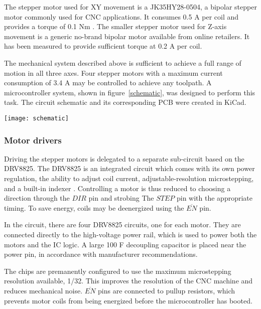 The stepper motor used for XY movement is a JK35HY28-0504, a bipolar stepper
motor commonly used for CNC applications. It consumes 0.5 A per coil and
provides a torque of 0.1 Nm \cite{jk35hy28}. The smaller stepper motor used for
Z-axis movement is a generic no-brand bipolar motor available from online
retailers. It has been measured to provide sufficient torque at 0.2 A per coil.

The mechanical system described above is sufficient to achieve a full range of
motion in all three axes. Four stepper motors with a maximum current consumption
of 3.4 A may be controlled to achieve any toolpath. A microcontroller system,
shown in figure~\ref{schematic}, was designed to perform this task. The
circuit schematic and its corresponding PCB were created in KiCad.

\clearpage
\begin{sidewaysfigure}[ht]
    \texttt{[image: schematic]}
    \caption{A schematic of the microcontroller system.}
    \label{schematic}
\end{sidewaysfigure}

\clearpage

\subsubsection{Motor drivers}

Driving the stepper motors is delegated to a separate sub-circuit based on the
DRV8825. The DRV8825 is an integrated circuit which comes with its own power
regulation, the ability to adjust coil current, adjustable-resolution
microstepping, and a built-in indexer \cite{drv8825}. Controlling a motor is
thus reduced to choosing a direction through the $DIR$ pin and strobing The
$STEP$ pin with the appropriate timing. To save energy, coils may be deenergized
using the $\overline{EN}$ pin.

In the circuit, there are four DRV8825 circuits, one for each motor. They are
connected directly to the high-voltage power rail, which is used to power both
the motors and the IC logic. A large 100 {\textmu}F decoupling capacitor is
placed near the power pin, in accordance with manufacturer recommendations.

The chips are premanently configured to use the maximum microstepping resolution
available, 1/32. This improves the resolution of the CNC machine and
reduces mechanical noise. $\overline{EN}$ pins are connected to pullup
resistors, which prevents motor coils from being energized before the
microcontroller has booted.

